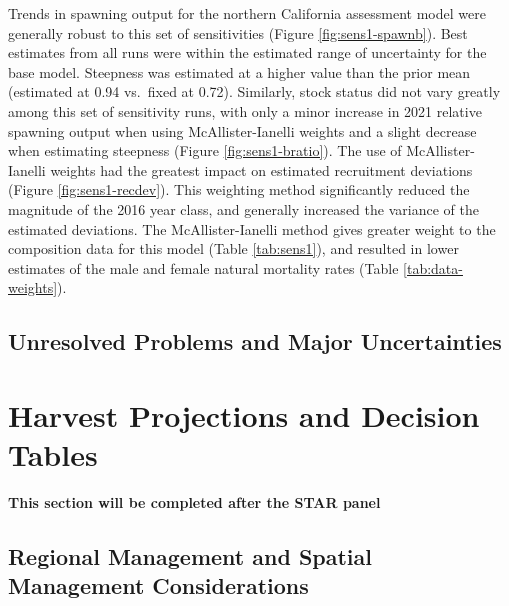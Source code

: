 \documentclass[
  english,
  a4paper,
]{article}
\begin{document}
Trends in spawning output for the northern California assessment model were generally robust to this set of sensitivities (Figure \ref{fig:sens1-spawnb}). Best estimates from all runs were within the estimated range of uncertainty for the base model. Steepness was estimated at a higher value than the prior mean (estimated at 0.94 vs.~fixed at 0.72). Similarly, stock status did not vary greatly among this set of sensitivity runs, with only a minor increase in 2021 relative spawning output when using McAllister-Ianelli weights and a slight decrease when estimating steepness (Figure \ref{fig:sens1-bratio}). The use of McAllister-Ianelli weights had the greatest impact on estimated recruitment deviations (Figure \ref{fig:sens1-recdev}). This weighting method significantly reduced the magnitude of the 2016 year class, and generally increased the variance of the estimated deviations. The McAllister-Ianelli method gives greater weight to the composition data for this model (Table \ref{tab:sens1}), and resulted in lower estimates of the male and female natural mortality rates (Table \ref{tab:data-weights}).

\hypertarget{unresolved-problems-and-major-uncertainties-1}{%
\subsection{Unresolved Problems and Major Uncertainties}\label{unresolved-problems-and-major-uncertainties-1}}

\hypertarget{harvest-projections-and-decision-tables}{%
\section{Harvest Projections and Decision Tables}\label{harvest-projections-and-decision-tables}}

\textbf{This section will be completed after the STAR panel}

\hypertarget{regional-management-and-spatial-management-considerations}{%
\subsection{Regional Management and Spatial Management Considerations}\label{regional-management-and-spatial-management-considerations}}
\end{document}

